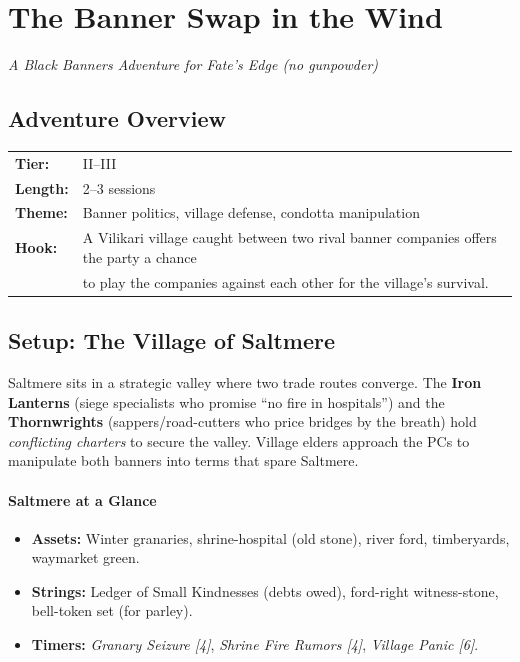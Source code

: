 \documentclass[11pt]{article}
\begin{document}

\section{The Banner Swap in the Wind}
\emph{A Black Banners Adventure for Fate's Edge (no gunpowder)}

\subsection*{Adventure Overview}
\begin{longtable}{@{}ll@{}}
\textbf{Tier:} & II--III \\
\textbf{Length:} & 2--3 sessions \\
\textbf{Theme:} & Banner politics, village defense, condotta manipulation \\
\textbf{Hook:} & A Vilikari village caught between two rival banner companies offers the party a chance \\
& to play the companies against each other for the village's survival.
\end{longtable}

\subsection*{Setup: The Village of Saltmere}
Saltmere sits in a strategic valley where two trade routes converge. The \textbf{Iron Lanterns} (siege specialists who promise ``no fire in hospitals'') and the \textbf{Thornwrights} (sappers/road-cutters who price bridges by the breath) hold \emph{conflicting charters} to secure the valley. Village elders approach the PCs to manipulate both banners into terms that spare Saltmere.

\paragraph{Saltmere at a Glance}
\begin{itemize}[leftmargin=*]
  \item \textbf{Assets:} Winter granaries, shrine-hospital (old stone), river ford, timberyards, waymarket green.
  \item \textbf{Strings:} Ledger of Small Kindnesses (debts owed), ford-right witness-stone, bell-token set (for parley).
  \item \textbf{Timers:} \emph{Granary Seizure [4]}, \emph{Shrine Fire Rumors [4]}, \emph{Village Panic [6]}.
\end{itemize}
\end{document}
